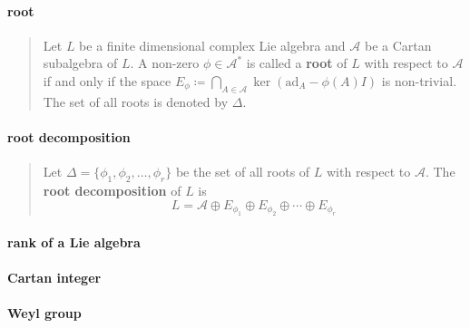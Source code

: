 \documentclass[letterpaper, 10pt]{article}
\theoremstyle{theostyle}
\begin{document}
\paragraph{root}
\begin{quote}
    Let \(L\) be a finite dimensional complex Lie algebra and \(\mathcal{A}\) be a Cartan subalgebra of \(L\).
    A non-zero \(\phi \in \mathcal{A}^\ast\) is called a \textbf{root} of \(L\) with respect to \(\mathcal{A}\) if and only if the space
    \(E_\phi \coloneqq \bigcap_{A \in \mathcal{A}} \ker{(\mathrm{ad}_A - \phi(A) I)}\) is non-trivial.
    The set of all roots is denoted by \(\Delta\).
\end{quote}

\paragraph{root decomposition}
\begin{quote}
    Let \(\Delta = \{\phi_1, \phi_2, \dots, \phi_r\}\) be the set of all roots of \(L\) with respect to \(\mathcal{A}\).
    The \textbf{root decomposition} of \(L\) is
    \[L = \mathcal{A} \oplus E_{\phi_1} \oplus E_{\phi_2} \oplus \cdots \oplus E_{\phi_r}\]
\end{quote}

\paragraph{rank of a Lie algebra}
\begin{quote}

\end{quote}

\paragraph{Cartan integer}
\begin{quote}
\end{quote}

\paragraph{Weyl group}
\begin{quote}
\end{quote}
\end{document}
